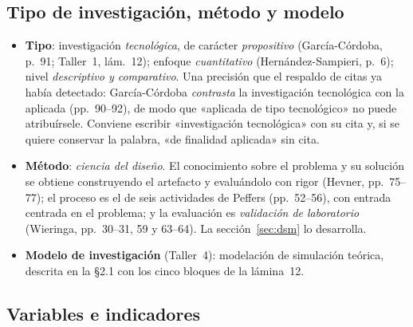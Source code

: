 \documentclass[11pt,a4paper]{article}
\begin{document}
\subsection{Tipo de investigación, método y modelo}

\begin{itemize}
\item \textbf{Tipo}: investigación \emph{tecnológica}, de carácter \emph{propositivo} (García-Córdoba, p.~91; Taller~1, lám.~12); enfoque \emph{cuantitativo} (Hernández-Sampieri, p.~6); nivel \emph{descriptivo y comparativo}. Una precisión que el respaldo de citas ya había detectado: García-Córdoba \emph{contrasta} la investigación tecnológica con la aplicada (pp.~90--92), de modo que «aplicada de tipo tecnológico» no puede atribuírsele. Conviene escribir «investigación tecnológica» con su cita y, si se quiere conservar la palabra, «de finalidad aplicada» sin cita.
\item \textbf{Método}: \emph{ciencia del diseño}. El conocimiento sobre el problema y su solución se obtiene construyendo el artefacto y evaluándolo con rigor (Hevner, pp.~75--77); el proceso es el de seis actividades de Peffers (pp.~52--56), con entrada centrada en el problema; y la evaluación es \emph{validación de laboratorio} (Wieringa, pp.~30--31, 59 y 63--64). La sección~\ref{sec:dsm} lo desarrolla.
\item \textbf{Modelo de investigación} (Taller~4): modelación de simulación teórica, descrita en la §2.1 con los cinco bloques de la lámina~12.
\end{itemize}

\subsection{Variables e indicadores}
\end{document}
